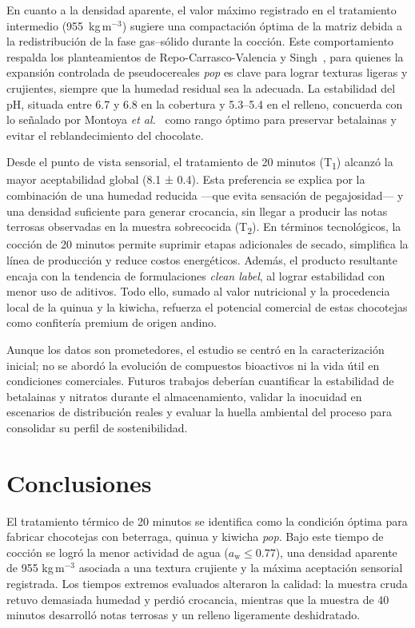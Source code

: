 \documentclass[manuscript,screen,review]{acmart}
\begin{document}
En cuanto a la densidad aparente, el valor máximo registrado en el tratamiento intermedio (955~kg\,m$^{-3}$) sugiere una compactación óptima de la matriz debida a la redistribución de la fase gas–sólido durante la cocción. Este comportamiento respalda los planteamientos de Repo-Carrasco-Valencia y Singh~\cite{RepoCarrascoValencia2009,Singh2023}, para quienes la expansión controlada de pseudocereales \textit{pop} es clave para lograr texturas ligeras y crujientes, siempre que la humedad residual sea la adecuada. La estabilidad del pH, situada entre 6.7 y 6.8 en la cobertura y 5.3–5.4 en el relleno, concuerda con lo señalado por Montoya \textit{et al.}~\cite{Montoya2011} como rango óptimo para preservar betalainas y evitar el reblandecimiento del chocolate.

Desde el punto de vista sensorial, el tratamiento de 20 minutos (T\textsubscript{1}) alcanzó la mayor aceptabilidad global (8.1 ± 0.4). Esta preferencia se explica por la combinación de una humedad reducida —que evita sensación de pegajosidad— y una densidad suficiente para generar crocancia, sin llegar a producir las notas terrosas observadas en la muestra sobrecocida (T\textsubscript{2}). En términos tecnológicos, la cocción de 20 minutos permite suprimir etapas adicionales de secado, simplifica la línea de producción y reduce costos energéticos. Además, el producto resultante encaja con la tendencia de formulaciones \emph{clean label}, al lograr estabilidad con menor uso de aditivos. Todo ello, sumado al valor nutricional y la procedencia local de la quinua y la kiwicha, refuerza el potencial comercial de estas chocotejas como confitería premium de origen andino.

Aunque los datos son prometedores, el estudio se centró en la caracterización inicial; no se abordó la evolución de compuestos bioactivos ni la vida útil en condiciones comerciales. Futuros trabajos deberían cuantificar la estabilidad de betalainas y nitratos durante el almacenamiento, validar la inocuidad en escenarios de distribución reales y evaluar la huella ambiental del proceso para consolidar su perfil de sostenibilidad.

\section{Conclusiones}

El tratamiento térmico de 20 minutos se identifica como la condición óptima para fabricar chocotejas con beterraga, quinua y kiwicha \textit{pop}. Bajo este tiempo de cocción se logró la menor actividad de agua ($a_\mathrm{w}\leq 0.77$), una densidad aparente de 955 kg\,m$^{-3}$ asociada a una textura crujiente y la máxima aceptación sensorial registrada. Los tiempos extremos evaluados alteraron la calidad: la muestra cruda retuvo demasiada humedad y perdió crocancia, mientras que la muestra de 40 minutos desarrolló notas terrosas y un relleno ligeramente deshidratado.
\end{document}
